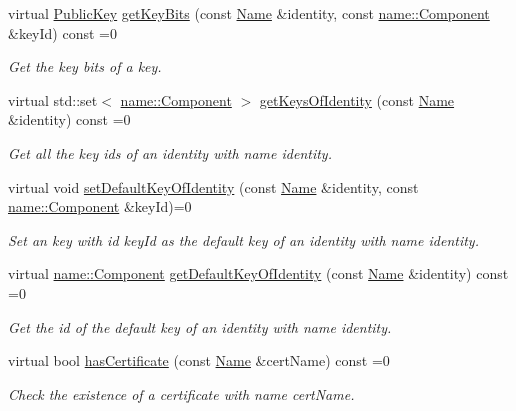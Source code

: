 \begin{DoxyCompactItemize}
virtual \hyperlink{classndn_1_1PublicKey}{Public\+Key} \hyperlink{classndn_1_1security_1_1PibImpl_a205525ca891259e8958cac739c36cb3f}{get\+Key\+Bits} (const \hyperlink{classndn_1_1Name}{Name} \&identity, const \hyperlink{classndn_1_1name_1_1Component}{name\+::\+Component} \&key\+Id) const =0
\begin{DoxyCompactList}\small\item\em Get the key bits of a key. \end{DoxyCompactList}\item 
virtual std\+::set$<$ \hyperlink{classndn_1_1name_1_1Component}{name\+::\+Component} $>$ \hyperlink{classndn_1_1security_1_1PibImpl_aac898235e4d52f871f7eb2eabfa03b37}{get\+Keys\+Of\+Identity} (const \hyperlink{classndn_1_1Name}{Name} \&identity) const =0
\begin{DoxyCompactList}\small\item\em Get all the key ids of an identity with name {\ttfamily identity}. \end{DoxyCompactList}\item 
virtual void \hyperlink{classndn_1_1security_1_1PibImpl_afdfed7ac6608c069315e787934a784f0}{set\+Default\+Key\+Of\+Identity} (const \hyperlink{classndn_1_1Name}{Name} \&identity, const \hyperlink{classndn_1_1name_1_1Component}{name\+::\+Component} \&key\+Id)=0
\begin{DoxyCompactList}\small\item\em Set an key with id {\ttfamily key\+Id} as the default key of an identity with name {\ttfamily identity}. \end{DoxyCompactList}\item 
virtual \hyperlink{classndn_1_1name_1_1Component}{name\+::\+Component} \hyperlink{classndn_1_1security_1_1PibImpl_a445023639b32f9acc3ffc54817095687}{get\+Default\+Key\+Of\+Identity} (const \hyperlink{classndn_1_1Name}{Name} \&identity) const =0
\begin{DoxyCompactList}\small\item\em Get the id of the default key of an identity with name {\ttfamily identity}. \end{DoxyCompactList}\item 
virtual bool \hyperlink{classndn_1_1security_1_1PibImpl_a2317a171218f3ca9dd7b3b12cf4c4877}{has\+Certificate} (const \hyperlink{classndn_1_1Name}{Name} \&cert\+Name) const =0
\begin{DoxyCompactList}\small\item\em Check the existence of a certificate with name {\ttfamily cert\+Name}. \end{DoxyCompactList}\item 

\end{DoxyCompactItemize}

